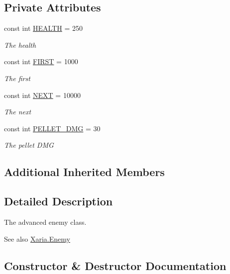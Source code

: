 \subsection*{Private Attributes}
\begin{DoxyCompactItemize}
\item 
const int \hyperlink{classXaria_1_1Enemies_1_1Advanced_a10332ad1a38382b9be6ed717fb02a742}{H\+E\+A\+L\+TH} = 250
\begin{DoxyCompactList}\small\item\em The health \end{DoxyCompactList}\item 
const int \hyperlink{classXaria_1_1Enemies_1_1Advanced_a1efb1e1025b39108f6e21e2693c722ff}{F\+I\+R\+ST} = 1000
\begin{DoxyCompactList}\small\item\em The first \end{DoxyCompactList}\item 
const int \hyperlink{classXaria_1_1Enemies_1_1Advanced_abc079eab62dbaf6181d250865c9361fc}{N\+E\+XT} = 10000
\begin{DoxyCompactList}\small\item\em The next \end{DoxyCompactList}\item 
const int \hyperlink{classXaria_1_1Enemies_1_1Advanced_af40b4a907388c5834bcc9374c184e0b7}{P\+E\+L\+L\+E\+T\+\_\+\+D\+MG} = 30
\begin{DoxyCompactList}\small\item\em The pellet D\+MG \end{DoxyCompactList}\end{DoxyCompactItemize}
\subsection*{Additional Inherited Members}


\subsection{Detailed Description}
The advanced enemy class. 

\begin{DoxySeeAlso}{See also}
\hyperlink{classXaria_1_1Enemy}{Xaria.\+Enemy}


\end{DoxySeeAlso}


\subsection{Constructor \& Destructor Documentation}
\mbox{\label{classXaria_1_1Enemies_1_1Advanced_a95ef3638503f6222b361af83bf94e7c5}} 
